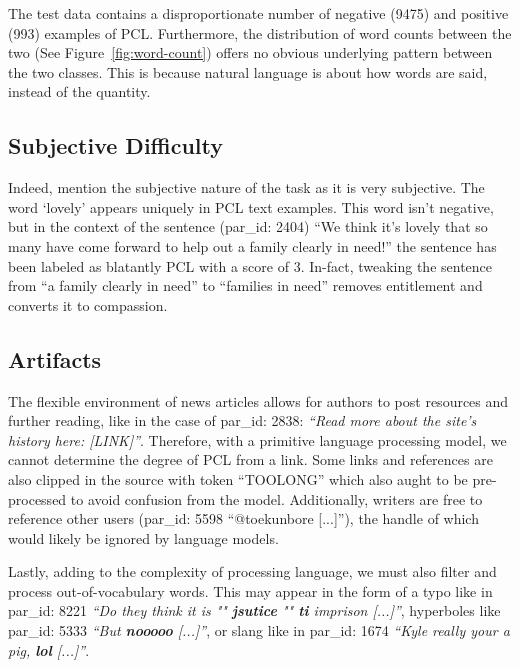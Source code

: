 \documentclass[11pt,a4paper]{article}
\begin{document}

The test data contains a disproportionate number of negative (9475) and positive (993) examples of PCL. Furthermore, the distribution of word counts between the two (See Figure~\ref{fig:word-count}) offers no obvious underlying pattern between the two classes. This is because natural language is about how words are said, instead of the quantity. 

\subsection{Subjective Difficulty}

Indeed, \citet{perez-almendros-etal-2020-dont} mention the subjective nature of the task as it is very subjective. The word `lovely' appears uniquely in PCL text examples. This word isn't negative, but in the context of the sentence (par\_id: 2404) ``We think it's lovely that so many have come forward to help out a family clearly in need!'' the sentence has been labeled as blatantly PCL with a score of 3. In-fact, tweaking the sentence from ``a family clearly in need'' to ``families in need'' removes entitlement and converts it to compassion.

\subsection{Artifacts}\label{sect:artifacts}

The flexible environment of news articles allows for authors to post resources and further reading, like in the case of par\_id: 2838: \emph{``Read more about the site's history here: [LINK]''}. Therefore, with a primitive language processing model, we cannot determine the degree of PCL from a link. Some links and references are also clipped in the source with token ``TOOLONG'' which also aught to be pre-processed to avoid confusion from the model. Additionally, writers are free to reference other users (par\_id: 5598 ``@toekunbore [...]''), the handle of which would likely be ignored by language models.

Lastly, adding to the complexity of processing language, we must also filter and process out-of-vocabulary words. This may appear in the form of a typo like in par\_id: 8221 \emph{``Do they think it is "" \textbf{jsutice} "" \textbf{ti} imprison [...]''}, hyperboles like par\_id: 5333 \emph{``But \textbf{nooooo} [...]''}, or slang like in par\_id: 1674 \emph{``Kyle really your a pig, \textbf{lol} [...]''}.
\end{document}
